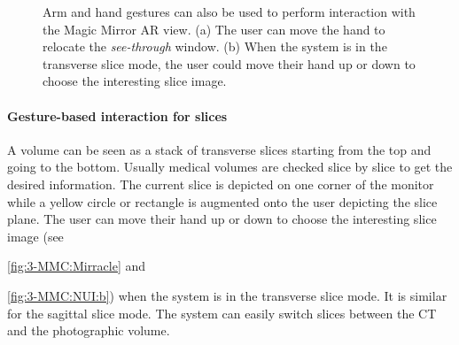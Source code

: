 {{{\begin{figure}
	\centering
	\caption[Natural User interaction]{Arm and hand gestures can also be used to perform interaction with the Magic Mirror AR view. (a) The user can move the hand to relocate the \textit{see-through} window. (b) When the system is in the transverse slice mode, the user could move their hand up or down to choose the interesting slice image. }
	\label{fig:3-MMC:NUI}
\end{figure}
\paragraph{Gesture-based interaction for slices} A volume can be seen as a stack of transverse slices starting from the top and going to the bottom. Usually medical volumes are checked slice by slice to get the desired information. The current slice is depicted on one corner of the monitor while a yellow circle or rectangle is augmented onto the user depicting the slice plane.
The user can move their hand up or down to choose the interesting slice image (see \figurename{\ref{fig:3-MMC:Mirracle} and \figurename{\ref{fig:3-MMC:NUI:b}) when the system is in the transverse slice mode. It is similar for the sagittal slice mode. The system can easily switch slices between the CT and the photographic volume.
		
}}}}}
